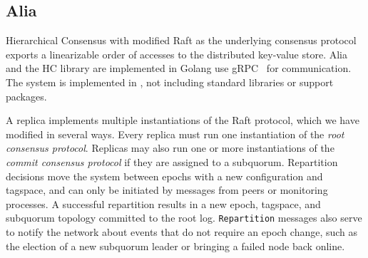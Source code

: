 \subsection{Alia}
\label{ch05_alia}

Hierarchical Consensus with modified Raft as the underlying consensus
protocol exports a linearizable order of accesses to the distributed key-value
store.
Alia and the HC library are implemented in Golang use gRPC~\cite{grpc} for
communication.
The system is implemented in , not including standard
libraries or support packages.

A replica implements multiple instantiations of the Raft protocol, which we have modified in several ways.
Every replica must run one instantiation of the \textit{root consensus protocol}.
Replicas may also run one or more instantiations of the \textit{commit consensus protocol} if they are assigned to a subquorum.
Repartition decisions move the system between epochs with a new configuration and tagspace, and can only be initiated by messages from peers or monitoring processes.
A successful repartition results in a new epoch, tagspace, and subquorum topology committed to the root log.
\texttt{Repartition} messages also serve to notify the network about events that do not require an epoch change, such as the election of a new subquorum leader or bringing a failed node back online.

